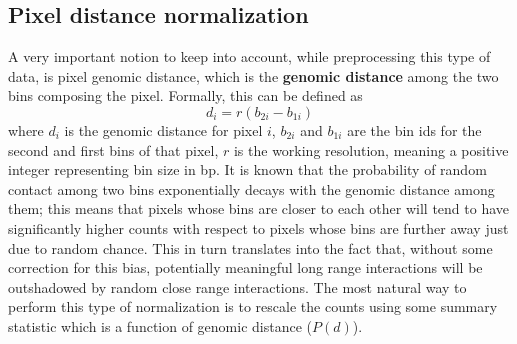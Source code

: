 \subsection{Pixel distance normalization}\label{par:distnorm}

A very important notion to keep into account, while preprocessing this type of data, is pixel genomic distance, which is the \textbf{genomic distance} among the two bins composing the pixel. Formally, this can be defined as 
$$d_i = r(b_{2i} - b_{1i})$$
where $d_i$ is the genomic distance for pixel $i$, $b_{2i}$ and $b_{1i}$ are the bin ids for the second and first bins of that pixel, $r$ is the working resolution, meaning a positive integer representing bin size in bp. It is known that the probability of random contact among two bins exponentially decays with the genomic distance among them\cite{distancedecay2009}; this means that pixels whose bins are closer to each other will tend to have significantly higher counts with respect to pixels whose bins are further away just due to random chance. This in turn translates into the fact that, without some correction for this bias, potentially meaningful long range interactions will be outshadowed by random close range interactions. The most natural way to perform this type of normalization is to rescale the counts using some summary statistic which is a function of genomic distance ($P(d)$).

